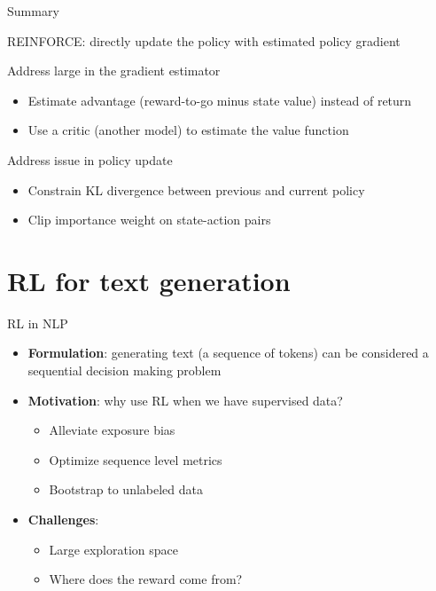 \documentclass[usenames,dvipsnames,notes,11pt,aspectratio=169,hyperref={colorlinks=true, linkcolor=blue}]{beamer}
\begin{document}
\begin{frame}
    {Summary}
    \begin{wideitemize}
        \item REINFORCE: directly update the policy with estimated policy gradient
        \item Address large  in the gradient estimator
            \begin{itemize}
                \item Estimate advantage (reward-to-go minus state value) instead of return
                \item Use a critic (another model) to estimate the value function 
            \end{itemize}
        \item Address  issue in policy update
            \begin{itemize}
                \item Constrain KL divergence between previous and current policy
                \item Clip importance weight on state-action pairs
            \end{itemize}
    \end{wideitemize}
\end{frame}

\section{RL for text generation}

\begin{frame}{RL in NLP}{}
    \begin{itemize}
        \itemsep1em
        \item {\bf Formulation}: generating text (a sequence of tokens) can be considered a sequential decision making problem
        \item {\bf Motivation}: why use RL when we have supervised data?
            \pause
            \begin{itemize}
                \item Alleviate exposure bias
                \item Optimize sequence level metrics
                \item Bootstrap to unlabeled data
            \end{itemize}
        \item {\bf Challenges}:\pause
            \begin{itemize}
                \item Large exploration space
                \item Where does the reward come from?
            \end{itemize}
    \end{itemize}
\end{frame}
\end{document}
